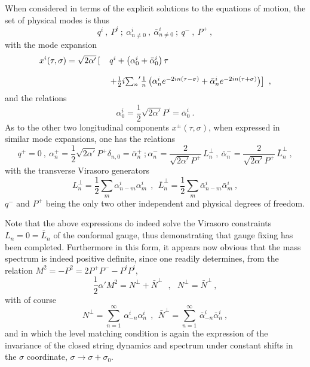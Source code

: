 \documentclass[a4paper,11pt]{article}
\begin{document}
When considered in terms of the explicit solutions to the equations of
motion, the set of physical modes is thus
\begin{equation}
q^i\ ,\ P^i\ ;\ \alpha^i_{n\ne 0}\ ,\ \bar{\alpha}^i_{n\ne 0}\ ;\
q^-\ ,\ P^+\ ,
\end{equation}
with the mode expansion
\begin{equation}
\begin{array}{r l}
x^i(\tau,\sigma)=\sqrt{2\alpha'}\left[\right.&q^i+
\left(\alpha^i_0+\bar{\alpha}^i_0\right)\tau\\
 & \\
&\left. +\frac{1}{2}i{\sum_n}'\frac{1}{n}
\left(\alpha^i_ne^{-2in(\tau-\sigma)}+
\bar{\alpha}^i_ne^{-2in(\tau+\sigma)}\right)\right]\ ,
\end{array}
\end{equation}
and the relations
\begin{equation}
\alpha^i_0=\frac{1}{2}\sqrt{2\alpha'}P^i=\bar{\alpha}^i_0\ .
\end{equation}
As to the other two longitudinal components $x^\pm(\tau,\sigma)$, when
expressed in similar mode expansions, one has the relations
\begin{equation}
q^+=0\ ,\
\alpha^+_n=\frac{1}{2}\sqrt{2\alpha'}P^+\delta_{n,0}=\bar{\alpha}^+_n\ ;
\alpha^-_n=\frac{2}{\sqrt{2\alpha'}P^+}\,L^\perp_n\ ,\
\bar{\alpha}^-_n=\frac{2}{\sqrt{2\alpha'}P^+}\,\bar{L}^\perp_n\ ,
\end{equation}
with the transverse Virasoro generators
\begin{equation}
L^\perp_n=\frac{1}{2}\sum_m\alpha^i_{n-m}\alpha^i_m\ \ ,\ \ 
\bar{L}^\perp_n=\frac{1}{2}\sum_m\bar{\alpha}^i_{n-m}\bar{\alpha}^i_m\ ,
\end{equation}
$q^-$ and $P^+$ being the only two other independent and physical degrees
of freedom. 

Note that the above expressions do indeed solve the Virasoro constraints
$L_n=0=\bar{L}_n$ of the conformal gauge, thus demonstrating that gauge
fixing has been completed. Furthermore in this form, it appears now
obvious that the mass spectrum is indeed positive definite, since one
readily determines, from the relation $M^2=-P^2=2P^+P^--P^iP^i$,
\begin{equation}
\frac{1}{2}\alpha' M^2=N^\perp+\bar{N}^\perp\ \ \ ,\ \ \ 
N^\perp=\bar{N}^\perp\ ,
\end{equation}
with of course
\begin{equation}
N^\perp=\sum_{n=1}^\infty\,\alpha^i_{-n}\alpha^i_n\ \ ,\ \ 
\bar{N}^\perp=\sum_{n=1}^\infty\,\bar{\alpha}^i_{-n}\bar{\alpha}^i_n\ ,
\end{equation}
and in which the level matching condition is again the expression of the
invariance of the closed string dynamics and spectrum under constant
shifts in the $\sigma$ coordinate, $\sigma\rightarrow\sigma+\sigma_0$.
\end{document}
